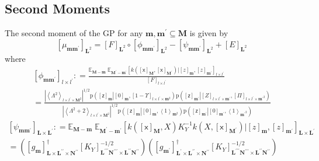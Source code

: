 \documentclass[preprint,12pt]{elsarticle}
\newcommand*{\M}[1]{\ensuremath{#1}\xspace}
\newcommand*{\x}{\times}
\newcommand*{\mi}[1]{\mathbf{#1}}
\newcommand*{\rv}[1]{\mathsf{#1}}
\newcommand*{\te}[2][]{\left\lbrack{#2}\right\rbrack_{#1}}
\newcommand*{\diag}[2][]{\left\langle{#2}\right\rangle_{#1}}
\newcommand*{\prob}[3]{\M{\mathrm{p}\!\left(\left.{#1}\right\vert{#2,#3}\right)}}
\newcommand*{\deq}{\M{\mathrel{\mathop:}=}}
\newcommand*{\evt}[3][]{\mathbb{E}_{#3}^{#1}\!#2}
\newcommand*{\modulus}[1]{\M{\left\lvert{#1}\right\rvert}}
\begin{document}
        \subsection{Second Moments} \label{sub:GPMom:Second}
        The second moment of the GP for any $\mi{m,m^{\prime}}\subseteq\mi{M}$ is given by
            \begin{equation*} \label{eq:GPMom:Second}
                \te[\mi{L}^2]{\mu_{\mi{mm^{\prime}}}} = 
                \te[\mi{L}^2]{F} \circ \te[\mi{L}^2]{\phi_{\mi{mm^{\prime}}}} - \te[\mi{L}^2]{\psi_{\mi{mm^{\prime}}}} + \te[\mi{L}^2]{E}                        
            \end{equation*}
            where
            \begin{multline*}
                \te[l\x l^{\prime}]{\phi_{\mi{mm^{\prime}}}}
                \deq \frac{\evt{\;\evt{\te[l\x l^{\prime}]{k\!\left(\te[\mi{M}]{\rv{x}},\te[\mi{M^{\prime}}]{\rv{x}}\right) \big\vert \te[\mi{m}]{z},\te[\mi{m^{\prime}}]{z}}}{\mi{M^{\prime}-m^{\prime}}}}{\mi{M-m}}}{\te[l\x l^{\prime}]{F}} \\
                = \frac
                {\modulus{\diag[l\x l^{\prime}\x\mi{M}^{2}]{\Lambda^{2}}}^{1/2} \prob{\te[\mi{m}]{\rv{z}}}{\te[\mi{m}]{0}}{\te[l\x l^{\prime}\x\mi{m}^2]{1-\Upsilon}}\prob{\te[\mi{m^{\prime}}]{\rv{z}}}{\te[l\x l^{\prime}\x \mi{m^{\prime}}]{Z}}{\te[l\x l^{\prime}\x\mi{m^{\prime}}^{2}]{\Pi}}}
                {\modulus{\diag[l\x l^{\prime}\x\mi{M}^2]{\Lambda^{2}+2}}^{1/2}
                \prob{\te[\mi{m}]{\rv{z}}}{\te[\mi{m}]{0}}{\diag[\mi{m}^{2}]{1}}\prob{\te[\mi{m^{\prime}}]{\rv{z}}}{\te[\mi{m^{\prime}}]{0}}{\diag[\mi{m^{\prime}}^{2}]{1}}}
            \end{multline*}
            \begin{multline*}
                \te[\mi{L\x L^{\prime}}]{\psi_{\mi{mm^{\prime}}}}
                \deq \evt{\;\evt{\te[\mi{L\x L^{\prime}}]{k\!\left(\te[\mi{M}]{\rv{x}},X\right) K_{Y}^{-1} k\!\left(X,\te[\mi{M^{\prime}}]{\rv{x}}\right) \big\vert \te[\mi{m}]{z},\te[\mi{m^{\prime}}]{z}}}{\mi{M^{\prime}-m^{\prime}}}}{\mi{M-m}} \\
                 = \left(\te[\mi{L\x L^{\prime\prime}\x N^{\prime\prime}}]{g_{\mi{m}}}^{\dagger}
                    \te[\mi{L^{\prime\prime\prime}N^{\prime\prime\prime}}\x\mi{L^{\prime\prime}N^{\prime\prime}}]{K_{Y}}^{-1/2}\right)
                \left(\te[\mi{L^{\prime}\x L^{\prime\prime}\x N^{\prime\prime}}]{g_{\mi{m^{\prime}}}}^{\dagger}
                    \te[\mi{L^{\prime\prime\prime}N^{\prime\prime\prime}}\x\mi{L^{\prime\prime}N^{\prime\prime}}]{K_{Y}}^{-1/2}\right)
            \end{multline*}
\end{document}
